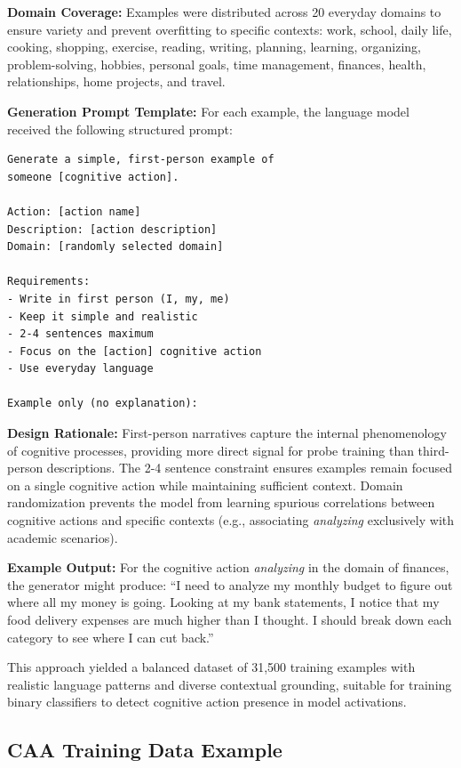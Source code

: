 \documentclass{article}
\begin{document}
\textbf{Domain Coverage:} Examples were distributed across 20 everyday domains to ensure variety and prevent overfitting to specific contexts: work, school, daily life, cooking, shopping, exercise, reading, writing, planning, learning, organizing, problem-solving, hobbies, personal goals, time management, finances, health, relationships, home projects, and travel.

\textbf{Generation Prompt Template:} For each example, the language model received the following structured prompt:

\begin{verbatim}
Generate a simple, first-person example of
someone [cognitive action].

Action: [action name]
Description: [action description]
Domain: [randomly selected domain]

Requirements:
- Write in first person (I, my, me)
- Keep it simple and realistic
- 2-4 sentences maximum
- Focus on the [action] cognitive action
- Use everyday language

Example only (no explanation):
\end{verbatim}

\textbf{Design Rationale:} First-person narratives capture the internal phenomenology of cognitive processes, providing more direct signal for probe training than third-person descriptions. The 2-4 sentence constraint ensures examples remain focused on a single cognitive action while maintaining sufficient context. Domain randomization prevents the model from learning spurious correlations between cognitive actions and specific contexts (e.g., associating \textit{analyzing} exclusively with academic scenarios).

\textbf{Example Output:} For the cognitive action \textit{analyzing} in the domain of finances, the generator might produce: ``I need to analyze my monthly budget to figure out where all my money is going. Looking at my bank statements, I notice that my food delivery expenses are much higher than I thought. I should break down each category to see where I can cut back.''

This approach yielded a balanced dataset of 31,500 training examples with realistic language patterns and diverse contextual grounding, suitable for training binary classifiers to detect cognitive action presence in model activations.


\subsection{CAA Training Data Example}
\end{document}

